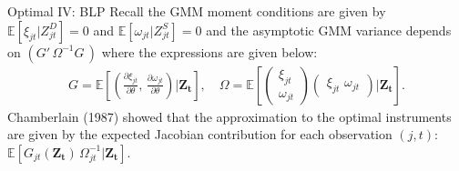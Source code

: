 \documentclass[aspectratio=169,10pt]{beamer}
\begin{document}
\begin{frame}{Optimal IV: BLP}
Recall the GMM moment conditions are given by $\mathbb{E}[\xi_{jt} | Z_{jt}^D]=0$ and $\mathbb{E}[\omega_{jt} | Z_{jt}^S]=0$ and the asymptotic GMM variance depends on $(G'\, \Omega^{-1} G\,)$ where the expressions are given below:
\begin{align*}
    G=\mathbb{E}\left[
    \left(\frac{\partial \xi_{jt}}{\partial \theta}, \,
    \frac{\partial \omega_{jt}}{\partial \theta} \right)
| \symbf{Z_t} \right], \quad 
\Omega = \mathbb{E}\left[
\begin{pmatrix}
    \xi_{jt} \\
    \omega_{jt}
\end{pmatrix}
\begin{pmatrix}
    \xi_{jt}\, \,
    \omega_{jt}
\end{pmatrix}
| \symbf{Z_t} \right].
\end{align*}
Chamberlain (1987) showed that the approximation to the optimal instruments are given by the expected Jacobian contribution for each observation $(j,t)$: $\mathbb{E}[G_{jt}(\symbf{Z_t})\, \Omega_{jt}^{-1} | \symbf{Z_t}]$.\\
\end{frame}
\end{document}
